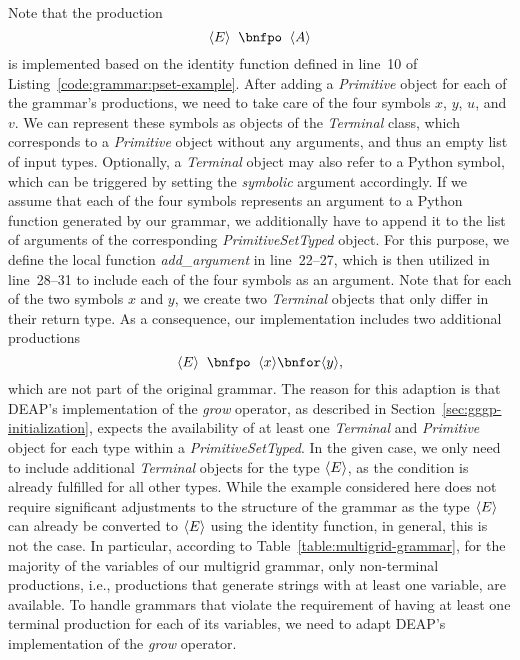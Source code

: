Note that the production
\begin{equation*}
	\ps E \; \; \bnfpo \; \; \ps A
\end{equation*}
is implemented based on the identity function defined in line~10 of Listing~\ref{code:grammar:pset-example}.
After adding a \emph{Primitive} object for each of the grammar's productions, we need to take care of the four symbols $x$, $y$, $u$, and $v$.
We can represent these symbols as objects of the \emph{Terminal} class, which corresponds to a \emph{Primitive} object without any arguments, and thus an empty list of input types.
Optionally, a \emph{Terminal} object may also refer to a Python symbol, which can be triggered by setting the \emph{symbolic} argument accordingly.
If we assume that each of the four symbols represents an argument to a Python function generated by our grammar, we additionally have to append it to the list of arguments of the corresponding \emph{PrimitiveSetTyped} object.
For this purpose, we define the local function \emph{add\_argument} in line~22--27, which is then utilized in line~28--31 to include each of the four symbols as an argument. 
Note that for each of the two symbols $x$ and $y$, we create two \emph{Terminal} objects that only differ in their return type.
As a consequence, our implementation includes two additional productions
\begin{equation*}
	\ps E \; \; \bnfpo \; \; \ps x \bnfor \ps y,
\end{equation*}
which are not part of the original grammar.
The reason for this adaption is that DEAP's implementation of the \emph{grow} operator, as described in Section~\ref{sec:gggp-initialization}, expects the availability of at least one \emph{Terminal} and \emph{Primitive} object for each type within a \emph{PrimitiveSetTyped}.
In the given case, we only need to include additional \emph{Terminal} objects for the type $\langle E \rangle$, as the condition is already fulfilled for all other types.
While the example considered here does not require significant adjustments to the structure of the grammar as the type $\langle E \rangle$ can already be converted to $\langle E \rangle$ using the identity function, in general, this is not the case.
In particular, according to Table~\ref{table:multigrid-grammar}, for the majority of the variables of our multigrid grammar, only non-terminal productions, i.e., productions that generate strings with at least one variable, are available.
To handle grammars that violate the requirement of having at least one terminal production for each of its variables, we need to adapt DEAP's implementation of the \emph{grow} operator.

